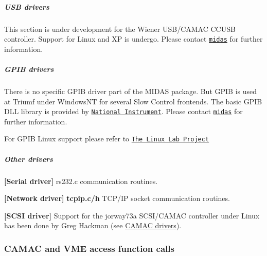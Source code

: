 \label{FE_Hardware_idx_Hardware_drivers_USB}
\hypertarget{FE_Hardware_idx_Hardware_drivers_USB}{}
 

 \hypertarget{FE_Hardware_USB_drivers}{}\subparagraph{USB drivers}\label{FE_Hardware_USB_drivers}
This section is under development for the Wiener USB/CAMAC CCUSB controller. Support for Linux and XP is undergo. Please contact \href{mailto:midas@psi.ch, midas@triumf.ca?subject=USB driver}{\tt midas} for further information.

\label{FE_Hardware_idx_Hardware_drivers_GPIB}
\hypertarget{FE_Hardware_idx_Hardware_drivers_GPIB}{}
 

 \hypertarget{FE_Hardware_GPIB_drivers}{}\subparagraph{GPIB drivers}\label{FE_Hardware_GPIB_drivers}
There is no specific GPIB driver part of the MIDAS package. But GPIB is used at Triumf under WindowsNT for several Slow Control frontends. The basic GPIB DLL library is provided by \href{http://www.ni.com/default.htm}{\tt National Instrument}. Please contact \href{mailto:midas@triumf.ca?subject=GPIB driver}{\tt midas} for further information.

For GPIB Linux support please refer to \href{http://www.llp.fu-berlin.de/pool/software/busses/}{\tt The Linux Lab Project}

\label{FE_Hardware_idx_Hardware_drivers_other}
\hypertarget{FE_Hardware_idx_Hardware_drivers_other}{}
 

 \hypertarget{FE_Hardware_Other_drivers}{}\subparagraph{Other drivers}\label{FE_Hardware_Other_drivers}

\begin{DoxyItemize}
\item {\bfseries \mbox{[}Serial driver\mbox{]}} rs232.c communication routines.
\item {\bfseries \mbox{[}Network driver\mbox{]}} {\bfseries tcpip.c/h} TCP/IP socket communication routines.
\item {\bfseries \mbox{[}SCSI driver\mbox{]}} Support for the jorway73a SCSI/CAMAC controller under Linux has been done by Greg Hackman (see \hyperlink{FE_Hardware_CAMAC_drivers}{CAMAC drivers}).
\end{DoxyItemize}

\par
 \par


 \par
 \label{index_end}
\hypertarget{index_end}{}
 \subsubsection{CAMAC and VME access function calls}\label{FE_camac_vme_function_calls}
\par
 

